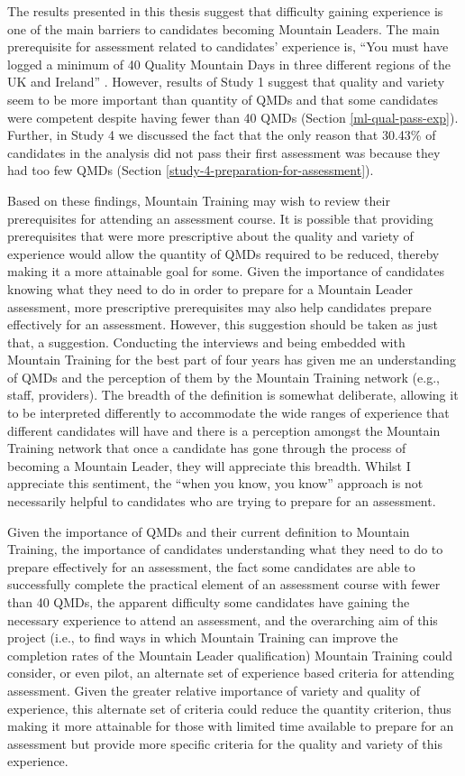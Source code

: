 \documentclass[
  12pt,
  a4paper,
]{book}
\begin{document}
The results presented in this thesis suggest that difficulty gaining experience is one of the main barriers to candidates becoming Mountain Leaders. The main prerequisite for assessment related to candidates' experience is, ``You must have logged a minimum of 40 Quality Mountain Days in three different regions of the UK and Ireland'' \citep[p 6]{MTUK2015a}. However, results of Study 1 suggest that quality and variety seem to be more important than quantity of QMDs and that some candidates were competent despite having fewer than 40 QMDs (Section \ref{ml-qual-pass-exp}). Further, in Study 4 we discussed the fact that the only reason that 30.43\% of candidates in the analysis did not pass their first assessment was because they had too few QMDs (Section \ref{study-4-preparation-for-assessment}).

Based on these findings, Mountain Training may wish to review their prerequisites for attending an assessment course. It is possible that providing prerequisites that were more prescriptive about the quality and variety of experience would allow the quantity of QMDs required to be reduced, thereby making it a more attainable goal for some. Given the importance of candidates knowing what they need to do in order to prepare for a Mountain Leader assessment, more prescriptive prerequisites may also help candidates prepare effectively for an assessment. However, this suggestion should be taken as just that, a suggestion. Conducting the interviews and being embedded with Mountain Training for the best part of four years has given me an understanding of QMDs and the perception of them by the Mountain Training network (e.g., staff, providers). The breadth of the definition is somewhat deliberate, allowing it to be interpreted differently to accommodate the wide ranges of experience that different candidates will have and there is a perception amongst the Mountain Training network that once a candidate has gone through the process of becoming a Mountain Leader, they will appreciate this breadth. Whilst I appreciate this sentiment, the ``when you know, you know'' approach is not necessarily helpful to candidates who are trying to prepare for an assessment.

Given the importance of QMDs and their current definition to Mountain Training, the importance of candidates understanding what they need to do to prepare effectively for an assessment, the fact some candidates are able to successfully complete the practical element of an assessment course with fewer than 40 QMDs, the apparent difficulty some candidates have gaining the necessary experience to attend an assessment, and the overarching aim of this project (i.e., to find ways in which Mountain Training can improve the completion rates of the Mountain Leader qualification) Mountain Training could consider, or even pilot, an alternate set of experience based criteria for attending assessment. Given the greater relative importance of variety and quality of experience, this alternate set of criteria could reduce the quantity criterion, thus making it more attainable for those with limited time available to prepare for an assessment but provide more specific criteria for the quality and variety of this experience.
\end{document}
